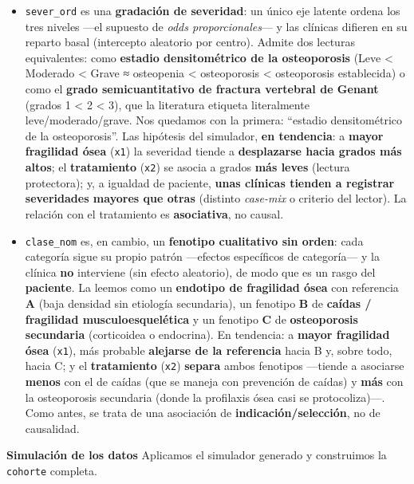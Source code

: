 \documentclass[
  letterpaper,
  DIV=11,
  numbers=noendperiod]{scrartcl}
\begin{document}
\begin{itemize}
\item
  \texttt{sever\_ord} es una \textbf{gradación de severidad}: un único
  eje latente ordena los tres niveles ---el supuesto de \emph{odds
  proporcionales}--- y las clínicas difieren en su reparto basal
  (intercepto aleatorio por centro). Admite dos lecturas equivalentes:
  como \textbf{estadio densitométrico de la osteoporosis} (Leve
  \textless{} Moderado \textless{} Grave ≈ osteopenia \textless{}
  osteoporosis \textless{} osteoporosis establecida) o como el
  \textbf{grado semicuantitativo de fractura vertebral de Genant}
  (grados 1 \textless{} 2 \textless{} 3), que la literatura etiqueta
  literalmente leve/moderado/grave. Nos quedamos con la primera:
  ``estadio densitométrico de la osteoporosis''. Las hipótesis del
  simulador, \textbf{en tendencia}: a \textbf{mayor fragilidad ósea}
  (\texttt{x1}) la severidad tiende a \textbf{desplazarse hacia grados
  más altos}; el \textbf{tratamiento} (\texttt{x2}) se asocia a grados
  \textbf{más leves} (lectura protectora); y, a igualdad de paciente,
  \textbf{unas clínicas tienden a registrar severidades mayores que
  otras} (distinto \emph{case-mix} o criterio del lector). La relación
  con el tratamiento es \textbf{asociativa}, no causal.
\item
  \texttt{clase\_nom} es, en cambio, un \textbf{fenotipo cualitativo sin
  orden}: cada categoría sigue su propio patrón ---efectos específicos
  de categoría--- y la clínica \textbf{no} interviene (sin efecto
  aleatorio), de modo que es un rasgo del \textbf{paciente}. La leemos
  como un \textbf{endotipo de fragilidad ósea} con referencia \textbf{A}
  (baja densidad sin etiología secundaria), un fenotipo \textbf{B} de
  \textbf{caídas / fragilidad musculoesquelética} y un fenotipo
  \textbf{C} de \textbf{osteoporosis secundaria} (corticoidea o
  endocrina). En tendencia: a \textbf{mayor fragilidad ósea}
  (\texttt{x1}), más probable \textbf{alejarse de la referencia} hacia B
  y, sobre todo, hacia C; y el \textbf{tratamiento} (\texttt{x2})
  \textbf{separa} ambos fenotipos ---tiende a asociarse \textbf{menos}
  con el de caídas (que se maneja con prevención de caídas) y
  \textbf{más} con la osteoporosis secundaria (donde la profilaxis ósea
  casi se protocoliza)---. Como antes, se trata de una asociación de
  \textbf{indicación/selección}, no de causalidad.
\end{itemize}

\textbf{Simulación de los datos} Aplicamos el simulador generado y
construimos la \texttt{cohorte} completa.
\end{document}
